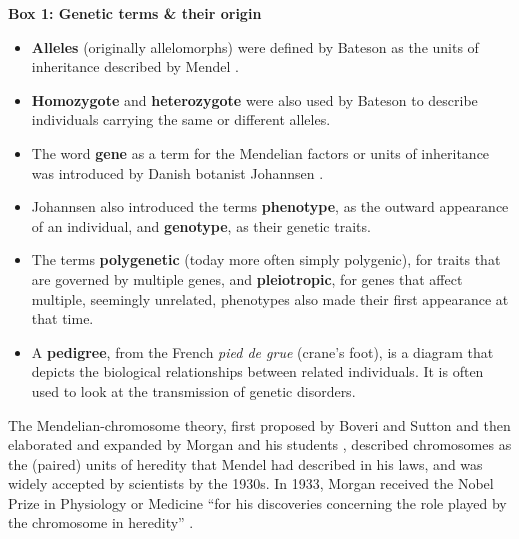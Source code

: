 \begin{Comment}
\hspace{-2.5mm}\textbf{Box 1: Genetic terms \& their origin}\label{box:genetic_terms}
\small
\begin{itemize}
    \item \textbf{Alleles} (originally allelomorphs) were defined by Bateson as the units of inheritance described by Mendel \cite{bateson2013mendel}.
    \item \textbf{Homozygote} and \textbf{heterozygote} were also used by Bateson to describe individuals carrying the same or different alleles.
    \item The word \textbf{gene} as a term for the Mendelian factors or units of inheritance was introduced by Danish botanist Johannsen \cite{johannsen1911genotype}. 
    \item Johannsen also introduced the terms \textbf{phenotype}, as the outward appearance of an individual, and \textbf{genotype}, as their genetic traits. 
    \item The terms \textbf{polygenetic} (today more often simply polygenic), for traits that are governed by multiple genes, and \textbf{pleiotropic}, for genes that affect multiple, seemingly unrelated, phenotypes also made their first appearance at that time. 
    \item A \textbf{pedigree}, from the French \textit{pied de grue} (crane's foot), is a diagram that depicts the biological relationships between related individuals.
    It is often used to look at the transmission of genetic disorders.
\end{itemize}
\vspace{3mm}
\end{Comment}

\vspace{3mm}

The Mendelian-chromosome theory, first proposed by Boveri and Sutton \cite{sutton1903chromosomes} and then elaborated and expanded by Morgan and his students \cite{morgan1915mechanism}, described chromosomes as the (paired) units of heredity that Mendel had described in his laws, and was widely accepted by scientists by the 1930s. 
In 1933, Morgan received the Nobel Prize in Physiology or Medicine “for his discoveries concerning the role played by the chromosome in heredity” \cite{nobel1933nobel}.\\

